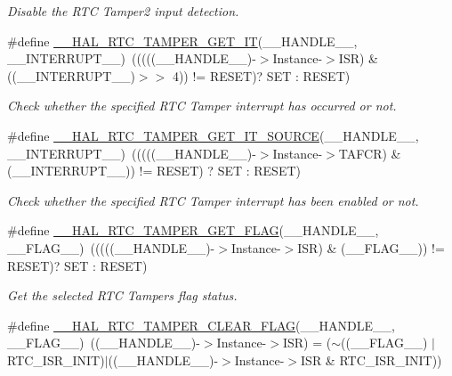 \begin{DoxyCompactItemize}
\begin{DoxyCompactList}\small\item\em Disable the R\+TC Tamper2 input detection. \end{DoxyCompactList}\item 
\#define \hyperlink{group___r_t_c_ex___tamper_ga20424c15833e5665016e87d1c8a0fdf4}{\+\_\+\+\_\+\+H\+A\+L\+\_\+\+R\+T\+C\+\_\+\+T\+A\+M\+P\+E\+R\+\_\+\+G\+E\+T\+\_\+\+IT}(\+\_\+\+\_\+\+H\+A\+N\+D\+L\+E\+\_\+\+\_\+,  \+\_\+\+\_\+\+I\+N\+T\+E\+R\+R\+U\+P\+T\+\_\+\+\_\+)~(((((\+\_\+\+\_\+\+H\+A\+N\+D\+L\+E\+\_\+\+\_\+)-\/$>$Instance-\/$>$I\+SR) \& ((\+\_\+\+\_\+\+I\+N\+T\+E\+R\+R\+U\+P\+T\+\_\+\+\_\+)$>$$>$ 4)) != R\+E\+S\+ET)? S\+ET \+: R\+E\+S\+ET)
\begin{DoxyCompactList}\small\item\em Check whether the specified R\+TC Tamper interrupt has occurred or not. \end{DoxyCompactList}\item 
\#define \hyperlink{group___r_t_c_ex___tamper_gae1de3775214da8d45c4625d4ad2b6f28}{\+\_\+\+\_\+\+H\+A\+L\+\_\+\+R\+T\+C\+\_\+\+T\+A\+M\+P\+E\+R\+\_\+\+G\+E\+T\+\_\+\+I\+T\+\_\+\+S\+O\+U\+R\+CE}(\+\_\+\+\_\+\+H\+A\+N\+D\+L\+E\+\_\+\+\_\+,  \+\_\+\+\_\+\+I\+N\+T\+E\+R\+R\+U\+P\+T\+\_\+\+\_\+)~(((((\+\_\+\+\_\+\+H\+A\+N\+D\+L\+E\+\_\+\+\_\+)-\/$>$Instance-\/$>$T\+A\+F\+CR) \& (\+\_\+\+\_\+\+I\+N\+T\+E\+R\+R\+U\+P\+T\+\_\+\+\_\+)) != R\+E\+S\+ET) ? S\+ET \+: R\+E\+S\+ET)
\begin{DoxyCompactList}\small\item\em Check whether the specified R\+TC Tamper interrupt has been enabled or not. \end{DoxyCompactList}\item 
\#define \hyperlink{group___r_t_c_ex___tamper_gafc2d73770375bd10cf6e4faa11adc7b1}{\+\_\+\+\_\+\+H\+A\+L\+\_\+\+R\+T\+C\+\_\+\+T\+A\+M\+P\+E\+R\+\_\+\+G\+E\+T\+\_\+\+F\+L\+AG}(\+\_\+\+\_\+\+H\+A\+N\+D\+L\+E\+\_\+\+\_\+,  \+\_\+\+\_\+\+F\+L\+A\+G\+\_\+\+\_\+)~(((((\+\_\+\+\_\+\+H\+A\+N\+D\+L\+E\+\_\+\+\_\+)-\/$>$Instance-\/$>$I\+SR) \& (\+\_\+\+\_\+\+F\+L\+A\+G\+\_\+\+\_\+)) != R\+E\+S\+ET)? S\+ET \+: R\+E\+S\+ET)
\begin{DoxyCompactList}\small\item\em Get the selected R\+TC Tamper\textquotesingle{}s flag status. \end{DoxyCompactList}\item 
\#define \hyperlink{group___r_t_c_ex___tamper_gade364b4cf1214d66463c9fa4ce667095}{\+\_\+\+\_\+\+H\+A\+L\+\_\+\+R\+T\+C\+\_\+\+T\+A\+M\+P\+E\+R\+\_\+\+C\+L\+E\+A\+R\+\_\+\+F\+L\+AG}(\+\_\+\+\_\+\+H\+A\+N\+D\+L\+E\+\_\+\+\_\+,  \+\_\+\+\_\+\+F\+L\+A\+G\+\_\+\+\_\+)~((\+\_\+\+\_\+\+H\+A\+N\+D\+L\+E\+\_\+\+\_\+)-\/$>$Instance-\/$>$I\+SR) = ($\sim$((\+\_\+\+\_\+\+F\+L\+A\+G\+\_\+\+\_\+) $\vert$ R\+T\+C\+\_\+\+I\+S\+R\+\_\+\+I\+N\+IT)$\vert$((\+\_\+\+\_\+\+H\+A\+N\+D\+L\+E\+\_\+\+\_\+)-\/$>$Instance-\/$>$I\+SR \& R\+T\+C\+\_\+\+I\+S\+R\+\_\+\+I\+N\+IT))
$$
\end{DoxyCompactItemize}
